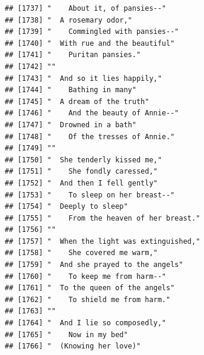 \documentclass{article}\usepackage[]{graphicx}\usepackage[]{color}
\makeatletter
\newenvironment{kframe}{%
 \def\at@end@of@kframe{}%
 \ifinner\ifhmode%
  \def\at@end@of@kframe{\end{minipage}}%
  \begin{minipage}{\columnwidth}%
 \fi\fi%
 \def\FrameCommand##1{\hskip\@totalleftmargin \hskip-\fboxsep
 \colorbox{shadecolor}{##1}\hskip-\fboxsep
     \hskip-\linewidth \hskip-\@totalleftmargin \hskip\columnwidth}%
 \MakeFramed {\advance\hsize-\width
   \@totalleftmargin\z@ \linewidth\hsize
   \@setminipage}}%
 {\par\unskip\endMakeFramed%
 \at@end@of@kframe}
\newenvironment{knitrout}{}{} %
\makeatother
\begin{document}
\begin{knitrout}
\begin{kframe}
\begin{verbatim}
## [1737] "    About it, of pansies--"                                                  
## [1738] "  A rosemary odor,"                                                          
## [1739] "    Commingled with pansies--"                                               
## [1740] "  With rue and the beautiful"                                                
## [1741] "    Puritan pansies."                                                        
## [1742] ""                                                                            
## [1743] "  And so it lies happily,"                                                   
## [1744] "    Bathing in many"                                                         
## [1745] "  A dream of the truth"                                                      
## [1746] "    And the beauty of Annie--"                                               
## [1747] "  Drowned in a bath"                                                         
## [1748] "    Of the tresses of Annie."                                                
## [1749] ""                                                                            
## [1750] "  She tenderly kissed me,"                                                   
## [1751] "    She fondly caressed,"                                                    
## [1752] "  And then I fell gently"                                                    
## [1753] "    To sleep on her breast--"                                                
## [1754] "  Deeply to sleep"                                                           
## [1755] "    From the heaven of her breast."                                          
## [1756] ""                                                                            
## [1757] "  When the light was extinguished,"                                          
## [1758] "    She covered me warm,"                                                    
## [1759] "  And she prayed to the angels"                                              
## [1760] "    To keep me from harm--"                                                  
## [1761] "  To the queen of the angels"                                                
## [1762] "    To shield me from harm."                                                 
## [1763] ""                                                                            
## [1764] "  And I lie so composedly,"                                                  
## [1765] "    Now in my bed"                                                           
## [1766] "  (Knowing her love)"                                                        

\end{verbatim}
\end{kframe}
\end{knitrout}
\end{document}
